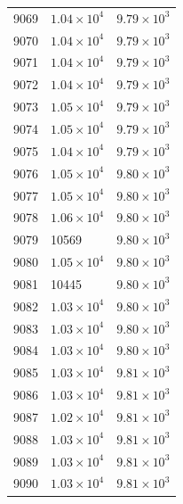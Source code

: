 \begin{table}[H]
\begin{tabular}{lll}
9069 & $\displaystyle 1.04 \times 10^{4}$ & $\displaystyle 9.79 \times 10^{3}$ \\
9070 & $\displaystyle 1.04 \times 10^{4}$ & $\displaystyle 9.79 \times 10^{3}$ \\
9071 & $\displaystyle 1.04 \times 10^{4}$ & $\displaystyle 9.79 \times 10^{3}$ \\
9072 & $\displaystyle 1.04 \times 10^{4}$ & $\displaystyle 9.79 \times 10^{3}$ \\
9073 & $\displaystyle 1.05 \times 10^{4}$ & $\displaystyle 9.79 \times 10^{3}$ \\
9074 & $\displaystyle 1.05 \times 10^{4}$ & $\displaystyle 9.79 \times 10^{3}$ \\
9075 & $\displaystyle 1.04 \times 10^{4}$ & $\displaystyle 9.79 \times 10^{3}$ \\
9076 & $\displaystyle 1.05 \times 10^{4}$ & $\displaystyle 9.80 \times 10^{3}$ \\
9077 & $\displaystyle 1.05 \times 10^{4}$ & $\displaystyle 9.80 \times 10^{3}$ \\
9078 & $\displaystyle 1.06 \times 10^{4}$ & $\displaystyle 9.80 \times 10^{3}$ \\
9079 & 10569 & $\displaystyle 9.80 \times 10^{3}$ \\
9080 & $\displaystyle 1.05 \times 10^{4}$ & $\displaystyle 9.80 \times 10^{3}$ \\
9081 & 10445 & $\displaystyle 9.80 \times 10^{3}$ \\
9082 & $\displaystyle 1.03 \times 10^{4}$ & $\displaystyle 9.80 \times 10^{3}$ \\
9083 & $\displaystyle 1.03 \times 10^{4}$ & $\displaystyle 9.80 \times 10^{3}$ \\
9084 & $\displaystyle 1.03 \times 10^{4}$ & $\displaystyle 9.80 \times 10^{3}$ \\
9085 & $\displaystyle 1.03 \times 10^{4}$ & $\displaystyle 9.81 \times 10^{3}$ \\
9086 & $\displaystyle 1.03 \times 10^{4}$ & $\displaystyle 9.81 \times 10^{3}$ \\
9087 & $\displaystyle 1.02 \times 10^{4}$ & $\displaystyle 9.81 \times 10^{3}$ \\
9088 & $\displaystyle 1.03 \times 10^{4}$ & $\displaystyle 9.81 \times 10^{3}$ \\
9089 & $\displaystyle 1.03 \times 10^{4}$ & $\displaystyle 9.81 \times 10^{3}$ \\
9090 & $\displaystyle 1.03 \times 10^{4}$ & $\displaystyle 9.81 \times 10^{3}$ \\

\end{tabular}
\end{table}
